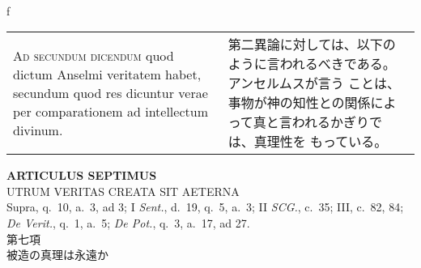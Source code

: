 \\f\documentclass[10pt]{jsarticle} %
\begin{document}
\begin{longtable}{p{21em}p{21em}}
\\

{\scshape Ad secundum dicendum} quod dictum Anselmi veritatem habet,
secundum quod res dicuntur verae per comparationem ad intellectum
divinum.


&

第二異論に対しては、以下のように言われるべきである。アンセルムスが言う
ことは、事物が神の知性との関係によって真と言われるかぎりでは、真理性を
もっている。

\\


\end{longtable}
\newpage

\begin{center}
 {\Large {\bf ARTICULUS SEPTIMUS}}\\
 {\large UTRUM VERITAS CREATA SIT AETERNA}\\
 {\footnotesize Supra, q.~10, a.~3, ad 3; I {\itshape Sent.}, d.~19,
 q.~5, a.~3; II {\itshape SCG.}, c.~35; III, c.~82, 84; {\itshape De
 Verit.}, q.~1, a.~5; {\itshape De Pot.}, q.~3, a.~17, ad 27.}\\
 {\Large 第七項\\被造の真理は永遠か}
\end{center}
\end{document}
